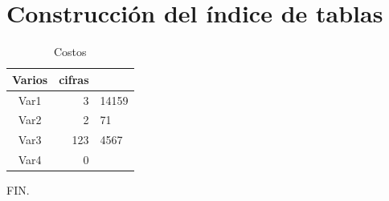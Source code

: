 \documentclass[]{article}
\begin{document}
	
\section{Construcción del índice de tablas}	
\lipsum[12-14]
\begin{table}[h]
	\centering
	\begin{center}
		\begin{tabular}[]{cr@{.}l}
			Varios &  cifras & \\
			\hline 
			Var1 & 3&14159 \\
			Var2 & 2&71 \\
			Var3 & 123&4567 \\
			Var4 & 0 &\\
			\hline	
			
		\end{tabular}
	\end{center}	
\caption{Costos}
\label{table:1}

\end{table}
	

	FIN.
	
\newpage	
	\listoftables
	\newpage
	\listoffigures
	\newpage
	\tableofcontents
	
\end{document}
